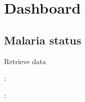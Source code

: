 \documentclass[letterpaper,10pt,english,openany,oneside]{sphinxmanual}
\begin{document}
\section{Dashboard}
\label{\detokenize{api/v4:dashboard}}

\subsection{Malaria status}
\label{\detokenize{api/v4:malaria-status}}

\begin{fulllineitems}
\label{\detokenize{api/v4:post--api4-Reports-vill_surveillance}}
\sphinxAtStartPar
Retrieve data

\sphinxAtStartPar
{}:

\begin{sphinxVerbatim}[commandchars=\\\{\}]
   
   
   
   
\end{sphinxVerbatim}

\sphinxAtStartPar
{}:


\end{fulllineitems}
\end{document}
